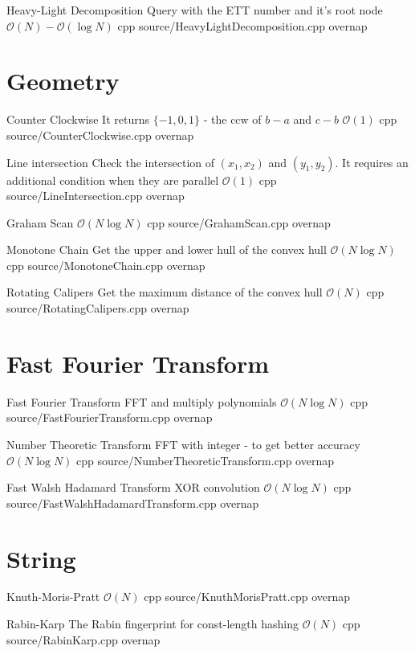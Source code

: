 \documentclass[landscape, 10pt, a4paper, oneside, twocolumn]{extarticle}
\begin{document}
\Algorithm
{Heavy-Light Decomposition}
{Query with the ETT number and it's root node}
{$\mathcal{O}(N)-\mathcal{O}(\log{N})$}
{cpp}
{source/HeavyLightDecomposition.cpp}
{overnap}


\section{Geometry}

\Algorithm
{Counter Clockwise}
{It returns $\{-1, 0, 1\}$ - the ccw of $b-a$ and $c-b$}
{$\mathcal{O}(1)$}
{cpp}
{source/CounterClockwise.cpp}
{overnap}

\Algorithm
{Line intersection}
{Check the intersection of $(x_1, x_2)$ and $(y_1, y_2)$. It requires an additional condition when they are parallel}
{$\mathcal{O}(1)$}
{cpp}
{source/LineIntersection.cpp}
{overnap}

\Algorithm
{Graham Scan}
{}
{$\mathcal{O}(N\log{N})$}
{cpp}
{source/GrahamScan.cpp}
{overnap}

\Algorithm
{Monotone Chain}
{Get the upper and lower hull of the convex hull}
{$\mathcal{O}(N\log{N})$}
{cpp}
{source/MonotoneChain.cpp}
{overnap}

\Algorithm
{Rotating Calipers}
{Get the maximum distance of the convex hull}
{$\mathcal{O}(N)$}
{cpp}
{source/RotatingCalipers.cpp}
{overnap}


\section{Fast Fourier Transform}

\Algorithm
{Fast Fourier Transform}
{FFT and multiply polynomials}
{$\mathcal{O}(N\log{N})$}
{cpp}
{source/FastFourierTransform.cpp}
{overnap}

\Algorithm
{Number Theoretic Transform}
{FFT with integer - to get better accuracy}
{$\mathcal{O}(N\log{N})$}
{cpp}
{source/NumberTheoreticTransform.cpp}
{overnap}

\Algorithm
{Fast Walsh Hadamard Transform}
{XOR convolution}
{$\mathcal{O}(N\log{N})$}
{cpp}
{source/FastWalshHadamardTransform.cpp}
{overnap}


\section{String}

\Algorithm
{Knuth-Moris-Pratt}
{}
{$\mathcal{O}(N)$}
{cpp}
{source/KnuthMorisPratt.cpp}
{overnap}

\Algorithm
{Rabin-Karp}
{The Rabin fingerprint for const-length hashing}
{$\mathcal{O}(N)$}
{cpp}
{source/RabinKarp.cpp}
{overnap}
\end{document}
